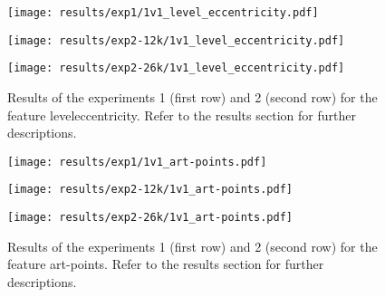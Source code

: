 \begin{figure}[h!]
    \centering
	\begin{minipage}{0.3\linewidth}
		\texttt{[image: results/exp1/1v1\_level\_eccentricity.pdf]}
	\end{minipage}

	\begin{minipage}{0.3\linewidth}
		\texttt{[image: results/exp2-12k/1v1\_level\_eccentricity.pdf]}
	\end{minipage}
	\begin{minipage}{0.3\linewidth}
		\texttt{[image: results/exp2-26k/1v1\_level\_eccentricity.pdf]}
	\end{minipage}

	\caption[ Results: Feature level\textunderscore eccentricity]{ Results of the experiments 1 (first row) and 2 (second row) for the feature level\textunderscore eccentricity. Refer to the results section for further descriptions. }
	\label{fig:appendix_level_eccentricity}
\end{figure}
 \newpage 

 
\begin{figure}[h!]
    \centering
	\begin{minipage}{0.3\linewidth}
		\texttt{[image: results/exp1/1v1\_art-points.pdf]}
	\end{minipage}

	\begin{minipage}{0.3\linewidth}
		\texttt{[image: results/exp2-12k/1v1\_art-points.pdf]}
	\end{minipage}
	\begin{minipage}{0.3\linewidth}
		\texttt{[image: results/exp2-26k/1v1\_art-points.pdf]}
	\end{minipage}

	\caption[ Results: Feature art-points]{ Results of the experiments 1 (first row) and 2 (second row) for the feature art-points. Refer to the results section for further descriptions. }
	\label{fig:appendix_art-points}
\end{figure}
 
